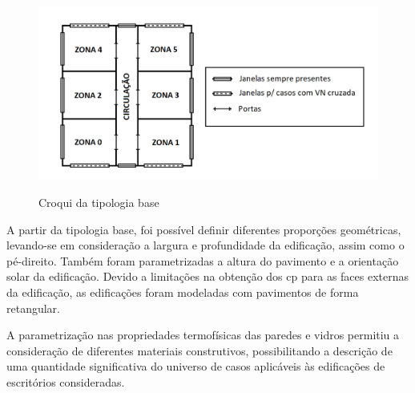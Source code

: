 \documentclass[brazil,hardcopy,openany]{ufscthesis} %
\begin{document}
\begin{figure}[h]
	\centering
	\caption{Croqui da tipologia base}
	\includegraphics[width=.8\linewidth]{img/croqui_07-11.png}
	\label{fig:croqui}
\end{figure}


A partir da tipologia base, foi possível definir diferentes proporções geométricas, levando-se em consideração a largura e profundidade da edificação, assim como o pé-direito. Também foram parametrizadas a altura do pavimento e a orientação solar da edificação.
Devido a limitações na obtenção dos \acrfull{cp} para as faces externas da edificação, as edificações foram modeladas com pavimentos de forma retangular.

A parametrização nas propriedades termofísicas das paredes e vidros permitiu a consideração de diferentes materiais construtivos, possibilitando a descrição de uma quantidade significativa do universo de casos aplicáveis às edificações de escritórios consideradas. %
\end{document}
